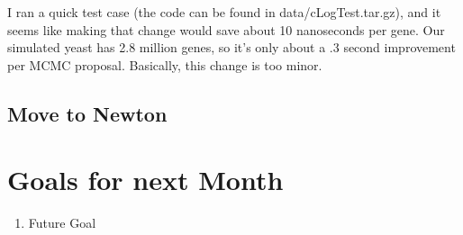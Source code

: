 I ran a quick test case (the code can be found in data/cLogTest.tar.gz), and it seems like making that change would save about 10 nanoseconds per gene. Our simulated yeast has 2.8 million genes, so it's only about a .3 second improvement per MCMC proposal. Basically, this change is too minor.

\subsection{Move to Newton}





\section{Goals for next Month}
\begin{enumerate}
\item Future Goal
\end{enumerate}


